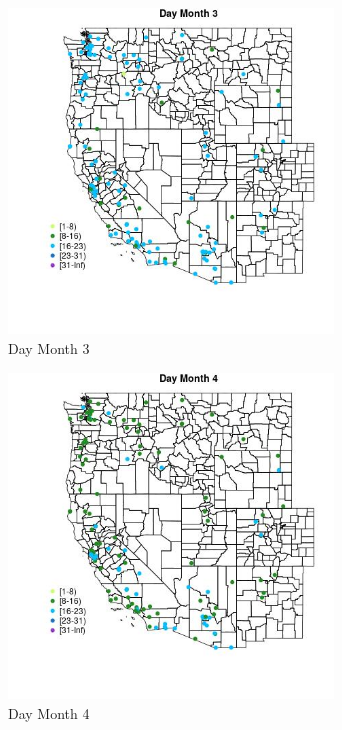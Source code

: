 \begin{figure} 
\centering  
\includegraphics[width=0.77\textwidth]{Code_Outputs/Report_ML_input_PM25_Step4_part_e_de_duplicated_aves_MapObsMo3Day.jpg} 
\caption{\label{fig:Report_ML_input_PM25_Step4_part_e_de_duplicated_avesMapObsMo3Day}Day Month 3} 
\end{figure} 
 

\begin{figure} 
\centering  
\includegraphics[width=0.77\textwidth]{Code_Outputs/Report_ML_input_PM25_Step4_part_e_de_duplicated_aves_MapObsMo4Day.jpg} 
\caption{\label{fig:Report_ML_input_PM25_Step4_part_e_de_duplicated_avesMapObsMo4Day}Day Month 4} 
\end{figure} 
 

